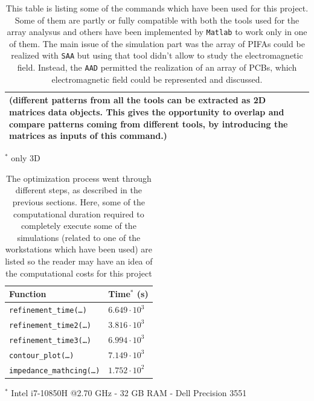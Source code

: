 \documentclass[10 pt,a4paper,twocolumn]{article}
\newcommand{\cmark}{\ding{51}}%
\begin{document}
{\begin{table}[bt!]
\begin{center}
{\begin{tabular}{|m{15.5cm}|c|c|}
			\small{{(different patterns from all the tools can be extracted as 2D matrices data objects. This gives the opportunity to overlap and compare patterns coming from different tools, by introducing the matrices as inputs of this command.)}} & \textcolor{ForestGreen}{\cmark} & \cmark \\
			\hline
	\end{tabular}}
\end{center}
	\footnotesize{$^*$ only 3D}
	\caption{This table is listing some of the commands which have been used for this project. Some of them are partly or fully compatible with both the tools used for the array analysus and others have been implemented by \texttt{\color{BurntOrange}Matlab} to work only in one of them. The main issue of the simulation part was the array of PIFAs could be realized with \texttt{\color{Mahogany}SAA} but using that tool didn't allow to study the electromagnetic field. Instead, the \texttt{\color{Mahogany}AAD} permitted the realization of an array of PCBs, which electromagnetic field could be represented and discussed.}
	\label{table:matlab commands}
\end{table} 

\begin{table}[bt!]
	\begin{center}
		{\selectfont
			\begin{tabular}{|m{5.4cm}|m{1.6cm}|}
				\hline
				\rowcolor{deepsaffron}\textbf{Function} & \textbf{Time$^*$} (s)  \\
			
				\hline
				\colorbox{backcolour}{\texttt{refinement\_time(\dots)}}	& $6.649\cdot 10^3$  \\
				\hline
				\colorbox{backcolour}{\texttt{refinement\_time2(\dots)}}	& $3.816\cdot 10^3$  \\
			\hline
				\colorbox{backcolour}{\texttt{refinement\_time3(\dots)}}	& $6.994\cdot 10^3$  \\
			\hline
				\colorbox{backcolour}{\texttt{contour\_plot(\dots)}}	& $7.149\cdot 10^3$  \\
			\hline
				\colorbox{backcolour}{\texttt{impedance\_mathcing(\dots)}}	& $1.752\cdot 10^2$  \\
			\hline

		\end{tabular}}
	\end{center}
	\tiny{$^*$ Intel i7-10850H @2.70 GHz - 32 GB RAM - Dell Precision 3551}
	\caption{The optimization process went through different steps, as described in the previous sections. Here, some of the computational duration required to completely execute some of the simulations (related to one of the workstations which have been used) are listed so the reader may have an idea of the computational costs for this project} 
	\label{table:time for functions}
\end{table} 

}
\end{document}
